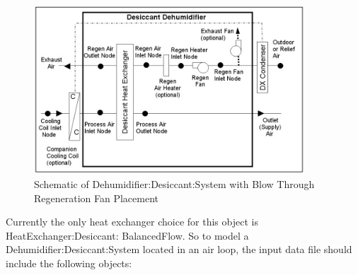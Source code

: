 \begin{figure}[hbtp] %
\centering
\includegraphics[width=0.9\textwidth, height=0.9\textheight, keepaspectratio=true]{media/image410.png}
\caption{Schematic of Dehumidifier:Desiccant:System with Blow Through Regeneration Fan Placement \protect \label{fig:schematic-of-dehumidifier-desiccant-system-001}}
\end{figure}

Currently the only heat exchanger choice for this object is HeatExchanger:Desiccant: BalancedFlow. So to model a Dehumidifier:Desiccant:System located in an air loop, the input data file should include the following objects:

